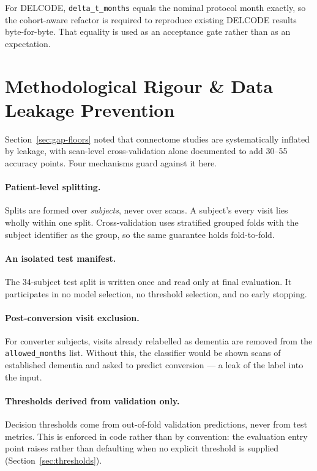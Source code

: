For DELCODE, \texttt{delta\_t\_months} equals the nominal protocol month exactly, so the
cohort-aware refactor is required to reproduce existing DELCODE results byte-for-byte. That
equality is used as an acceptance gate rather than as an expectation.

\section{Methodological Rigour \& Data Leakage Prevention}
\label{sec:leakage}

Section~\ref{sec:gap-floors} noted that connectome studies are systematically inflated by
leakage, with scan-level cross-validation alone documented to add 30--55 accuracy points.
Four mechanisms guard against it here.

\paragraph{Patient-level splitting.} Splits are formed over \emph{subjects}, never over
scans. A subject's every visit lies wholly within one split. Cross-validation uses stratified
grouped folds with the subject identifier as the group, so the same guarantee holds
fold-to-fold.

\paragraph{An isolated test manifest.} The 34-subject test split is written once and read
only at final evaluation. It participates in no model selection, no threshold selection, and
no early stopping.

\paragraph{Post-conversion visit exclusion.} For converter subjects, visits already
relabelled as dementia are removed from the \texttt{allowed\_months} list. Without this, the
classifier would be shown scans of established dementia and asked to predict conversion ---
a leak of the label into the input.

\paragraph{Thresholds derived from validation only.} Decision thresholds come from
out-of-fold validation predictions, never from test metrics. This is enforced in code rather
than by convention: the evaluation entry point raises rather than defaulting when no explicit
threshold is supplied (Section~\ref{sec:thresholds}).

